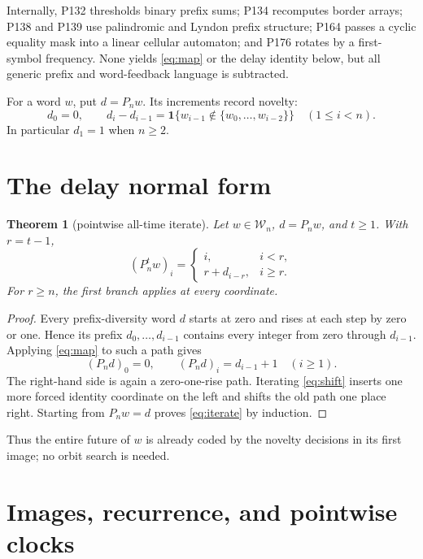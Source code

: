 \documentclass[a4paper,10pt]{amsart}
\newtheorem{theorem}{Theorem}
\theoremstyle{remark}
\newcommand{\W}{\mathcal W}
\begin{document}
Internally, P132 thresholds binary prefix sums; P134 recomputes border arrays;
P138 and P139 use palindromic and Lyndon prefix structure; P164 passes a
cyclic equality mask into a linear cellular automaton; and P176 rotates by a
first-symbol frequency.  None yields \eqref{eq:map} or the delay identity
below, but all generic prefix and word-feedback language is subtracted.

For a word $w$, put $d=P_nw$.  Its increments record novelty:
\begin{equation}\label{eq:novelty}
 d_0=0,\qquad d_i-d_{i-1}=\mathbf1\{w_{i-1}\notin
 \{w_0,\ldots,w_{i-2}\}\}\quad(1\le i<n).
\end{equation}
In particular $d_1=1$ when $n\ge2$.

\section{The delay normal form}

\begin{theorem}[pointwise all-time iterate]\label{thm:iterate}
Let $w\in\W_n$, $d=P_nw$, and $t\ge1$.  With $r=t-1$,
\begin{equation}\label{eq:iterate}
 (P_n^tw)_i=
 \begin{cases}
 i,&i<r,\\
 r+d_{i-r},&i\ge r.
 \end{cases}
\end{equation}
For $r\ge n$, the first branch applies at every coordinate.
\end{theorem}

\begin{proof}
Every prefix-diversity word $d$ starts at zero and rises at each step by zero
or one.  Hence its prefix $d_0,\ldots,d_{i-1}$ contains every integer from
zero through $d_{i-1}$.  Applying \eqref{eq:map} to such a path gives
\begin{equation}\label{eq:shift}
 (P_nd)_0=0,\qquad (P_nd)_i=d_{i-1}+1\quad(i\ge1).
\end{equation}
The right-hand side is again a zero-one-rise path.  Iterating
\eqref{eq:shift} inserts one more forced identity coordinate on the left and
shifts the old path one place right.  Starting from $P_nw=d$ proves
\eqref{eq:iterate} by induction.
\end{proof}

Thus the entire future of $w$ is already coded by the novelty decisions in
its first image; no orbit search is needed.

\section{Images, recurrence, and pointwise clocks}
\end{document}
